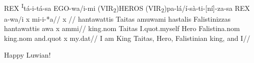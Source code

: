 \documentclass[12pt,A4]{article}
\begin{document}

\begingl[glwordalign=center,glhangstyle=none, aboveglftskip=0pt, everygla=\normalfont, everyglluw=\Luwian]
\gla REX \textsuperscript{I}t\'a-i-t\'a-sa EGO-wa/i-mi (VIR\textsubscript{2})HEROS (VIR\textsubscript{2})pa-l\'a/\'i-s\`a-ti-[n\'i]-za-sa REX a-wa/i x mi-i-*a//
\glluw {\REX} {\PERS\TA[2]\I\TA[2]\SA} {\EGO\WAI\MI} {\VIR[2]\HEROS} {\VIR[2]\PA\LAI[2]\SA[3]\TI\NI[2]\ZA\SA} {\REX} {\A\WAI} x {\MI\I\A}//
\glb hantawattis Taitas amu\badeq wa\badeq mi hastalis Falistinizzas hantawattis a\badeq wa x ammi//
\glc king.nom Taitas I.quot.myself Hero Falistina.nom king.nom and.quot x my.dat//
\glft I am King Taitas, Hero, Falistinian king, and I\newline//
\endgl

Happy Luwian!
\end{document}
